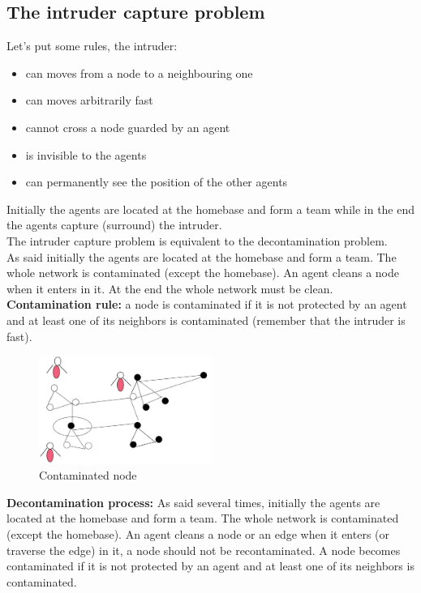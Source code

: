 \documentclass[paper=a4, fontsize=11pt]{scrartcl} %
\numberwithin{equation}{section} %
\numberwithin{figure}{section} %
\numberwithin{table}{section} %
\begin{document}
\subsection*{The intruder capture problem}
Let's put some rules, the intruder:
\begin{itemize}
\item can moves from a node to a neighbouring one
\item can moves arbitrarily fast
\item cannot cross a node guarded by an agent
\item is invisible to the agents
\item can permanently see the position of the other agents
\end{itemize}
Initially the agents are located at the homebase and form a team while in the end the agents capture (surround) the intruder. \\
The intruder capture problem is equivalent to the decontamination problem.\\
As said initially the agents are located at the homebase and form a team. The whole network is contaminated (except the homebase). An agent cleans a node when it enters in it. At the end the whole network must be clean.\\
\textbf{Contamination rule:} a node is contaminated if it is not protected by an agent and at least one of its neighbors is contaminated (remember that the intruder is fast). 
\begin{figure}[H]
  \centering
  \includegraphics[width=0.5\textwidth]{img/cont.png}
  \caption{Contaminated node}
  \label{fig:boat1}
\end{figure}
\textbf{Decontamination process:} As said several times, initially the agents are located at the homebase and form a team. The whole network is contaminated (except the homebase). An agent cleans a node or an edge when it enters (or traverse the edge) in it, a node should not be recontaminated. A node becomes contaminated if it is not protected by an agent and at least one of its neighbors is contaminated.\\
\end{document}
